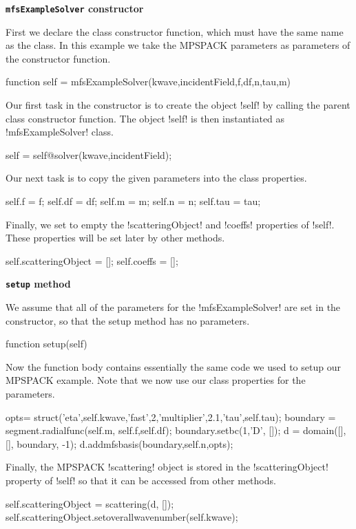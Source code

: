 \documentclass[12pt,letterpaper,final]{article}
\newcommand{\techheading}[1]{%
    \par\vspace{-0.3\parskip}\noindent\hspace{-1cm}\textbf{#1}%
    \par\vspace{-0.5\parskip}\noindent\nopagebreak\ignorespaces}
\begin{document}
\techheading{\texttt{mfsExampleSolver} constructor}
First we declare the class constructor function, which must have the
same name as the class.
In this example we take the MPSPACK parameters as parameters of the 
constructor function.
\begin{matlab}
function self = mfsExampleSolver(kwave,incidentField,f,df,n,tau,m)
\end{matlab}
Our first task in the constructor
is to create the object !self! by calling the parent 
class constructor function. The object !self! is then instantiated as
!mfsExampleSolver! class.
\begin{matlab}                        
    self = self@solver(kwave,incidentField);           
\end{matlab}
Our next task is to copy the given parameters into the class properties.
\begin{matlab}
    self.f = f;
    self.df = df;
    self.m = m;
    self.n = n;
    self.tau = tau;
\end{matlab}
Finally, we set to empty the !scatteringObject! and !coeffs! properties
of !self!.
These properties will be set later by other methods.
\begin{matlab}
    self.scatteringObject = [];
    self.coeffs = [];
\end{matlab}

\techheading{\texttt{setup} method}
We assume that all of the parameters for the !mfsExampleSolver! are set
in the constructor, so that the setup method has no parameters.
\begin{matlab}
function setup(self)
\end{matlab}
Now the function body contains essentially the same code we used to setup
our MPSPACK example.
Note that we now use our class properties for the parameters.
\begin{matlab}
    opts= struct('eta',self.kwave,'fast',2,'multiplier',2.1,'tau',self.tau);
    boundary = segment.radialfunc(self.m, {self.f,self.df});
    boundary.setbc(1,'D', []);
    d = domain([], [], boundary, -1);
    d.addmfsbasis(boundary,self.n,opts);
\end{matlab}
Finally, the MPSPACK !scattering! object is stored in the 
!scatteringObject! property of !self! so that it can be accessed from 
other methods.
\begin{matlab}
    self.scatteringObject = scattering(d, []);
    self.scatteringObject.setoverallwavenumber(self.kwave);
\end{matlab}
\end{document}
